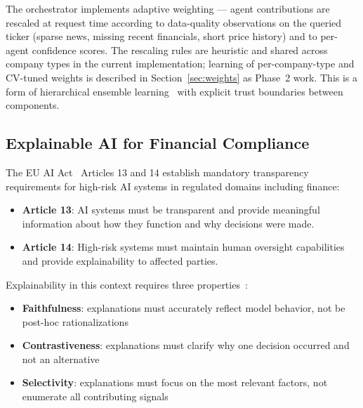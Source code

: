 \documentclass[conference]{IEEEtran}
\begin{document}
The orchestrator implements adaptive weighting --- agent contributions are rescaled at request time according to data-quality observations on the queried ticker (sparse news, missing recent financials, short price history) and to per-agent confidence scores. The rescaling rules are heuristic and shared across company types in the current implementation; learning of per-company-type and CV-tuned weights is described in Section~\ref{sec:weights} as Phase~2 work. This is a form of hierarchical ensemble learning~\cite{ref:ensemble} with explicit trust boundaries between components.

\subsection{Explainable AI for Financial Compliance}

The EU AI Act~\cite{ref:eu_ai_act} Articles 13 and 14 establish mandatory transparency requirements for high-risk AI systems in regulated domains including finance:

\begin{itemize}
\item \textbf{Article 13}: AI systems must be transparent and provide meaningful information about how they function and why decisions were made.
\item \textbf{Article 14}: High-risk systems must maintain human oversight capabilities and provide explainability to affected parties.
\end{itemize}

Explainability in this context requires three properties~\cite{ref:explainability}:
\begin{itemize}
\item \textbf{Faithfulness}: explanations must accurately reflect model behavior, not be post-hoc rationalizations
\item \textbf{Contrastiveness}: explanations must clarify why one decision occurred and not an alternative
\item \textbf{Selectivity}: explanations must focus on the most relevant factors, not enumerate all contributing signals
\end{itemize}
\end{document}
